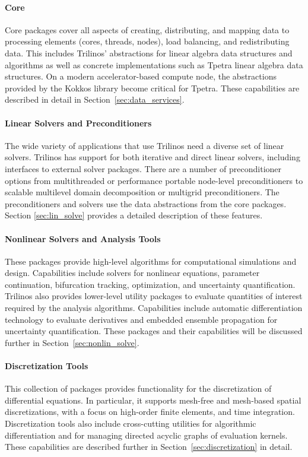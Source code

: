 \paragraph{Core} Core packages cover all aspects of creating, distributing, and mapping data to processing elements (cores, threads, nodes), load balancing, and redistributing data. This includes Trilinos' abstractions for linear algebra data structures and algorithms as well as concrete implementations such as Tpetra linear algebra data structures. On a modern accelerator-based compute node, the abstractions provided by the Kokkos library become critical for Tpetra. These capabilities are described in detail in Section~\ref{sec:data_services}.

\paragraph{Linear Solvers and Preconditioners} The wide variety of applications that use Trilinos need a diverse set of linear solvers. Trilinos has support for both iterative and direct linear solvers, including interfaces to external solver packages. There are a number of preconditioner options from multithreaded or performance portable node-level preconditioners to scalable multilevel domain decomposition or multigrid preconditioners. The preconditioners and solvers use the data abstractions from the core packages. Section \ref{sec:lin_solve} provides a detailed description of these features.

\paragraph{Nonlinear Solvers and Analysis Tools} These packages provide high-level algorithms for computational simulations and design. Capabilities include solvers for nonlinear equations, parameter continuation, bifurcation tracking, optimization, and uncertainty quantification. Trilinos also provides lower-level utility packages to evaluate quantities of interest required by the analysis algorithms. Capabilities include automatic differentiation technology to evaluate derivatives and embedded ensemble propagation for uncertainty quantification. These packages and their capabilities will be discussed further in Section~\ref{sec:nonlin_solve}.

\paragraph{Discretization Tools} This collection of packages provides functionality for the discretization of differential equations. In particular, it supports mesh-free and mesh-based spatial discretizations, with a focus on high-order finite elements, and time integration. Discretization tools also include cross-cutting utilities for algorithmic differentiation and for managing directed acyclic graphs of evaluation kernels. These capabilities are described further in Section~\ref{sec:discretization} in detail.

